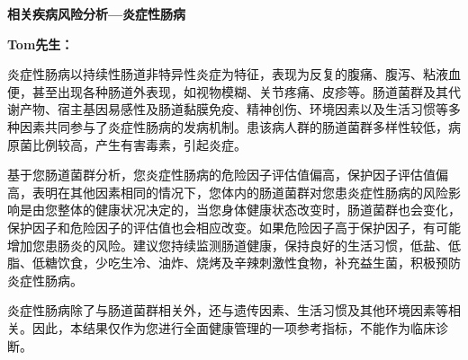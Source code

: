 \bigskip
{}
\newpage

\setlength{\arrayrulewidth}{0.5pt}
\fontsize{9.3pt}{17pt}\selectfont
\color{gray2}

\vspace*{0mm}
\begin{center}
{\bf\sanhao 相关疾病风险分析—炎症性肠病}
\end{center}

\medskip

\noindent
{\bf\xiaosihao Tom先生：}


\bigskip
炎症性肠病以持续性肠道非特异性炎症为特征，表现为反复的腹痛、腹泻、粘液血便，甚至出现各种肠道外表现，如视物模糊、关节疼痛、皮疹等。肠道菌群及其代谢产物、宿主基因易感性及肠道黏膜免疫、精神创伤、环境因素以及生活习惯等多种因素共同参与了炎症性肠病的发病机制。患该病人群的肠道菌群多样性较低，病原菌比例较高，产生有害毒素，引起炎症。

基于您肠道菌群分析，您炎症性肠病的危险因子评估值偏高，保护因子评估值偏高，表明在其他因素相同的情况下，您体内的肠道菌群对您患炎症性肠病的风险影响是由您整体的健康状况决定的，当您身体健康状态改变时，肠道菌群也会变化，保护因子和危险因子的评估值也会相应改变。如果危险因子高于保护因子，有可能增加您患肠炎的风险。建议您持续监测肠道健康，保持良好的生活习惯，低盐、低脂、低糖饮食，少吃生冷、油炸、烧烤及辛辣刺激性食物，补充益生菌，积极预防炎症性肠病。

炎症性肠病除了与肠道菌群相关外，还与遗传因素、生活习惯及其他环境因素等相关。因此，本结果仅作为您进行全面健康管理的一项参考指标，不能作为临床诊断。

